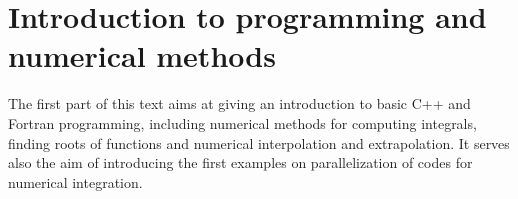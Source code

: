 
\part{Introduction to programming and numerical methods}
The first part of this text aims at giving an introduction to basic C++ and Fortran programming, including numerical methods for computing integrals, finding
roots of functions and numerical interpolation and extrapolation.  It serves also the aim of introducing the first examples on parallelization of codes for numerical integration.
